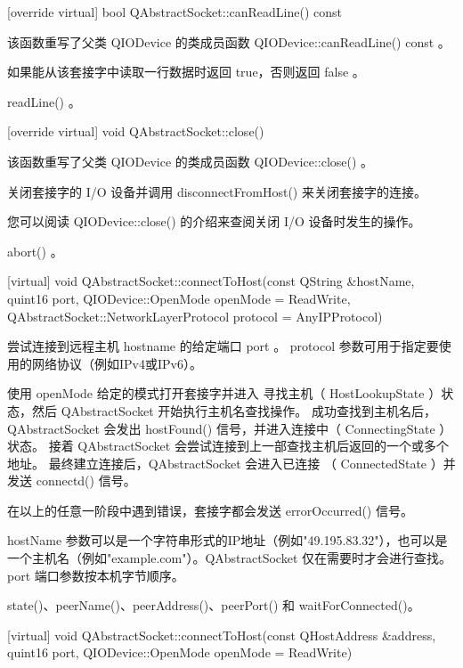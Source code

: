 [override virtual] bool QAbstractSocket::canReadLine() const

该函数重写了父类 QIODevice 的类成员函数 QIODevice::canReadLine() const 。

如果能从该套接字中读取一行数据时返回 true，否则返回 false 。



\begin{seeAlso}
readLine() 。
\end{seeAlso}

[override virtual] void QAbstractSocket::close()

该函数重写了父类 QIODevice 的类成员函数 QIODevice::close() 。

关闭套接字的 I/O 设备并调用 disconnectFromHost() 来关闭套接字的连接。

您可以阅读 QIODevice::close() 的介绍来查阅关闭 I/O 设备时发生的操作。


\begin{seeAlso}
abort() 。
\end{seeAlso}


[virtual] void QAbstractSocket::connectToHost(const QString \&hostName,
quint16 port, QIODevice::OpenMode openMode = ReadWrite,
QAbstractSocket::NetworkLayerProtocol protocol = AnyIPProtocol)

尝试连接到远程主机 hostname 的给定端口 port 。 protocol 参数可用于指定要使用的网络协议（例如IPv4或IPv6）。

使用 openMode 给定的模式打开套接字并进入 寻找主机（ HostLookupState ）状态，然后 QAbstractSocket 开始执行主机名查找操作。 成功查找到主机名后， QAbstractSocket 会发出 hostFound() 信号，并进入连接中（ ConnectingState ）状态。 接着 QAbstractSocket 会尝试连接到上一部查找主机后返回的一个或多个地址。 最终建立连接后，QAbstractSocket 会进入已连接 （ ConnectedState ）并发送 connectd() 信号。

在以上的任意一阶段中遇到错误，套接字都会发送 errorOccurred() 信号。

hostName 参数可以是一个字符串形式的IP地址（例如"49.195.83.32"），也可以是一个主机名（例如"example.com"）。QAbstractSocket 仅在需要时才会进行查找。 port 端口参数按本机字节顺序。


\begin{seeAlso}
state()、peerName()、peerAddress()、peerPort() 和 waitForConnected()。
\end{seeAlso}

[virtual] void QAbstractSocket::connectToHost(const QHostAddress
\&address, quint16 port, QIODevice::OpenMode openMode = ReadWrite)

